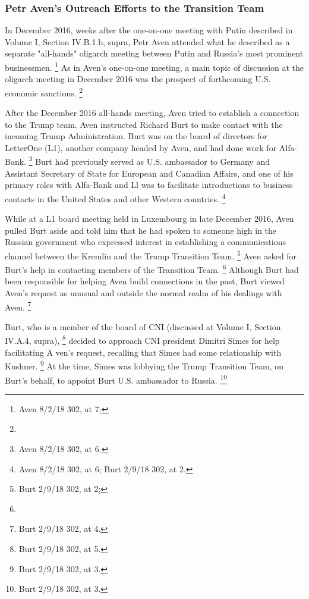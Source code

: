 \subsubsection{Petr Aven's Outreach Efforts to the Transition Team}

In December 2016, weeks after the one-on-one meeting with Putin described in Volume I, Section IV.B.1.b, supra, Petr Aven attended what he described as a separate "all-hands" oligarch meeting between Putin and Russia's most prominent businessmen.%
\footnote{Aven 8/2/18 302, at 7; }
As in Aven's one-on-one meeting, a main topic of discussion at the oligarch meeting in December 2016 was the prospect of forthcoming U.S. economic sanctions.%
\footnote{}

After the December 2016 all-hands meeting, Aven tried to establish a connection to the Trump team.
Aven instructed Richard Burt to make contact with the incoming Trump Administration.
Burt was on the board of directors for LetterOne (L1), another company headed by Aven, and had done work for Alfa-Bank.%
\footnote{ Aven 8/2/18 302, at 6.}
Burt had previously served as U.S. ambassador to Germany and Assistant Secretary of State for European and Canadian Affairs, and one of his primary roles with Alfa-Bank and Ll was to facilitate introductions to business contacts in the United States and other Western countries.%
\footnote{ Aven 8/2/18 302, at 6;
Burt 2/9/18 302, at 2.}

While at a L1 board meeting held in Luxembourg in late December 2016, Aven pulled Burt aside and told him that he had spoken to someone high in the Russian government who expressed interest in establishing a communications channel between the Kremlin and the Trump Transition Team.%
\footnote{Burt 2/9/18 302, at 2; }
Aven asked for Burt's help in contacting members of the Transition Team.%
\footnote{}
Although Burt had been responsible for helping Aven build connections in the past, Burt viewed Aven's request as unusual and outside the normal realm of his dealings with Aven.%
\footnote{Burt 2/9/18 302, at 4.}

Burt, who is a member of the board of CNI (discussed at Volume I, Section IV.A.4, supra),%
\footnote{Burt 2/9/18 302, at 5.}
decided to approach CNI president Dimitri Simes for help facilitating A ven's request, recalling that Simes had some relationship with Kushner.%
\footnote{Burt 2/9/18 302, at 3.}
At the time, Simes was lobbying the Trump Transition Team, on Burt's behalf, to appoint Burt U.S. ambassador to Russia.%
\footnote{Burt 2/9/18 302, at 3.}

